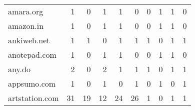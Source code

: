 \begin{tabular}{lrrrrrrrrr}
                  amara.org &                                1 &                                  0 &                                      1 &                            1 &                           0 &                                   0 &                                      1 &                             1 &                            0 \\
                  amazon.in &                                1 &                                  0 &                                      1 &                            1 &                           0 &                                   0 &                                      1 &                             1 &                            0 \\
                ankiweb.net &                                1 &                                  1 &                                      0 &                            1 &                           1 &                                   1 &                                      0 &                             1 &                            1 \\
               anotepad.com &                                1 &                                  0 &                                      1 &                            1 &                           0 &                                   0 &                                      1 &                             1 &                            0 \\
                     any.do &                                2 &                                  0 &                                      2 &                            1 &                           1 &                                   1 &                                      0 &                             1 &                            1 \\
                appsumo.com &                                1 &                                  0 &                                      1 &                            0 &                           1 &                                   0 &                                      1 &                             0 &                            1 \\
             artstation.com &                               31 &                                 19 &                                     12 &                           24 &                          26 &                                   1 &                                      0 &                             1 &                            1 \\

\end{tabular}
